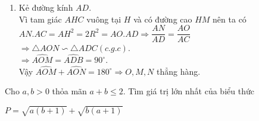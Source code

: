 \begin{ex}
{\begin{enumerate}
		mà $\widehat{ABC}=\widehat{AHM}$\\
		$\Rightarrow \widehat{OAC}+\widehat{ANM}=90^\circ\Rightarrow AO\perp MN$.
		\item Kẻ đường kính $AD$.\\
		Vì tam giác $AHC$ vuông tại $H$ và có đường cao $HM$ nên ta có $AN.AC=AH^2=2R^2=AO.AD\Rightarrow \dfrac{AN}{AD}=\dfrac{AO}{AC}$\\
		$\Rightarrow \triangle AON\backsim\triangle ADC(c.g.c)$.\\
		$\Rightarrow \widehat{AOM}=\widehat{ADB}=90^\circ$.\\
		Vậy $\widehat{AOM}+\widehat{AON}=180^\circ\Rightarrow O,M,N$ thẳng hàng.
	\end{enumerate}
	}
\end{ex}
\begin{ex}%
	Cho $a,b>0$ thỏa mãn $a+b\leq 2$. Tìm giá trị lớn nhất của biểu thức
	\begin{center}
		$P=\sqrt{a(b+1)}+\sqrt{b(a+1)}$
	\end{center}
\end{ex}
